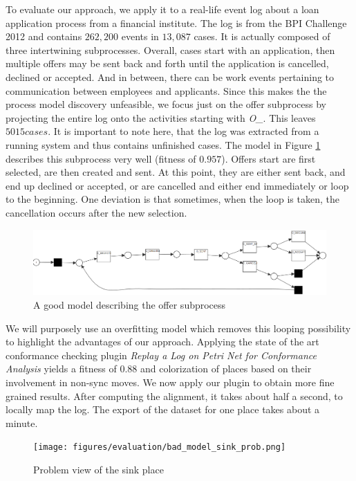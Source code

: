 To evaluate our approach, we apply it to a real-life event log about a loan application process from a financial institute.
The log is from the BPI Challenge 2012 \cite{bpi2012log} and contains $262,200$ events in $13,087$ cases. It is actually composed of three intertwining subprocesses. Overall, cases start with an application, then multiple offers may be sent back and forth until the application is cancelled, declined or accepted. And in between, there can be work events pertaining to communication between employees and applicants. Since this makes the the process model discovery unfeasible, we focus just on the offer subprocess by projecting the entire log onto the activities starting with \emph{O\_}. This leaves $5015 cases$. It is important to note here, that the log was extracted from a running system and thus contains unfinished cases.
The model in Figure \ref{fig:goodmodel} describes this subprocess very well (fitness of $0.957$). Offers start are first selected, are then created and sent. At this point, they are either sent back, and end up declined or accepted, or are cancelled and either end immediately or loop to the beginning. One deviation is that sometimes, when the loop is taken, the cancellation occurs after the new selection.
\begin{figure}
    \centering
    \includegraphics[width=\textwidth]{figures/evaluation/good_model.png}
    \caption{A good model describing the offer subprocess}
    \label{fig:goodmodel}
\end{figure}

We will purposely use an overfitting model which removes this looping possibility to highlight the advantages of our approach.
Applying the state of the art conformance checking plugin \emph{Replay a Log on Petri Net for Conformance Analysis} yields a fitness of $0.88$ and colorization of places based on their involvement in non-sync moves.
We now apply our plugin to obtain more fine grained results. After computing the alignment, it takes about half a second, to locally map the log. The export of the dataset for one place takes about a minute.
\begin{figure}[H]
    \centering
    \texttt{[image: figures/evaluation/bad\_model\_sink\_prob.png]}
    \caption{Problem view of the sink place}
    \label{fig:badsinkprob}
\end{figure}

